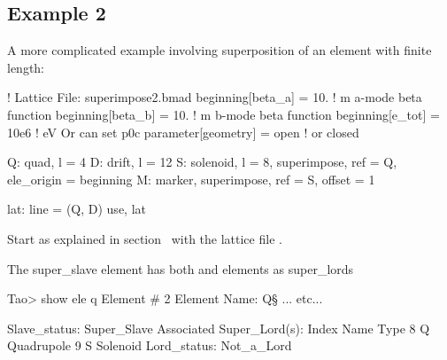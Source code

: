 \documentclass{hitec}
\begin{document}
\subsection{Example 2}

A more complicated example involving superposition of an element with finite length:
\begin{code}
! Lattice File: superimpose2.bmad
beginning[beta_a] = 10.   ! m  a-mode beta function
beginning[beta_b] = 10.   ! m  b-mode beta function
beginning[e_tot] = 10e6   ! eV   Or can set p0c
parameter[geometry] = open      ! or closed

Q: quad, l = 4
D: drift, l = 12
S: solenoid, l = 8, superimpose, ref = Q, ele_origin = beginning
M: marker, superimpose, ref = S, offset = 1

lat: line = (Q, D)
use, lat
\end{code}

Start \tao as explained in section~ with the lattice file
.


The  super_slave element has both  and  elements as super_lords
\begin{code}
Tao> show ele q\s
 Element #                2
 Element Name: Q\S
... etc...

Slave_status: Super_Slave
Associated Super_Lord(s):
   Index   Name                             Type
       8   Q                                Quadrupole
       9   S                                Solenoid
Lord_status:  Not_a_Lord
\end{code}
\end{document}
